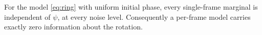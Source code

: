 
\begin{theorem}
\label{thm:blind}
For the model \eqref{eq:ring} with uniform initial phase, every single-frame marginal is
independent of $\psi$, at every noise level. Consequently a per-frame model carries exactly zero
information about the rotation.
\end{theorem}
